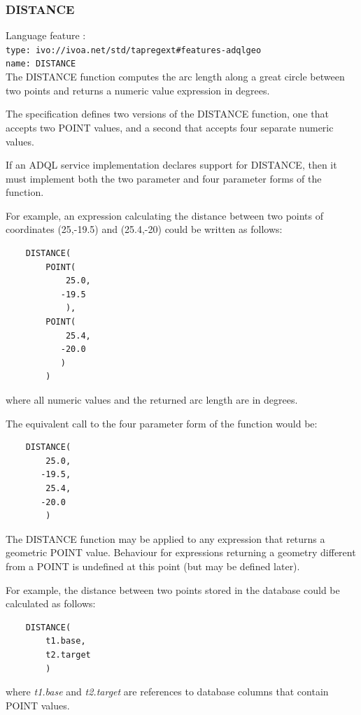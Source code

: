 \documentclass[11pt,a4paper]{ivoa}
\begin{document}
\subsubsection{DISTANCE}
\label{sec:functions.geom.distance}
{\footnotesize Language feature :}\\
{\footnotesize \verb|type: ivo://ivoa.net/std/tapregext#features-adqlgeo|}\\
{\footnotesize \verb|name: DISTANCE|}\\

The DISTANCE function computes the arc length along a great circle between two
points and returns a numeric value expression in degrees.

The specification defines two versions of the DISTANCE function, one that
accepts two POINT values, and a second that accepts four separate numeric
values.

If an ADQL service implementation declares support for DISTANCE,
then it must implement both the two parameter and four parameter
forms of the function.

For example, an expression calculating the distance between two points of
coordinates (25,-19.5) and (25.4,-20) could be written as follows:
\begin{verbatim}
    DISTANCE(
        POINT(
            25.0,
           -19.5
            ),
        POINT(
            25.4,
           -20.0
           )
        )
\end{verbatim}
\noindent
where all numeric values and the returned arc length are in degrees.

The equivalent call to the four parameter form of the function would be:
\begin{verbatim}
    DISTANCE(
        25.0,
       -19.5,
        25.4,
       -20.0
        )
\end{verbatim}

The DISTANCE function may be applied to any expression that returns a
geometric POINT value. Behaviour for expressions returning a geometry different
from a POINT is undefined at this point (but may be defined later).

For example, the distance between two points stored in the database could
be calculated as follows:
\begin{verbatim}
    DISTANCE(
        t1.base,
        t2.target
        )
\end{verbatim}
\noindent
where \textit{t1.base} and \textit{t2.target} are references to
database columns that contain POINT values.
\end{document}
